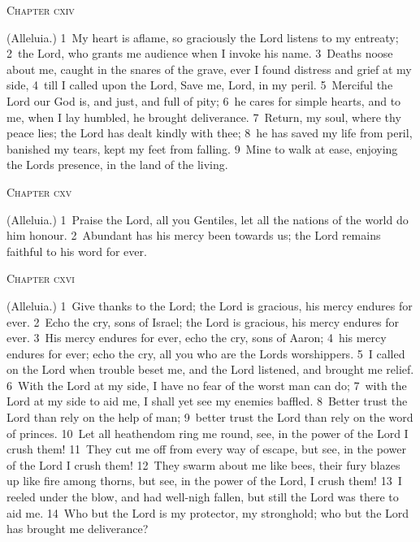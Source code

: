 \documentclass[10pt]{book} %
\begin{document}
\begin{large}\begin{center}\textsc{Chapter cxiv}\end{center}\end{large}
(Alleluia.)
\textcolor{benred8}{1}~My heart is aflame, so graciously the Lord listens to my entreaty; \textcolor{benred8}{2}~the Lord, who grants me audience when I invoke his name. \textcolor{benred8}{3}~Death\textquotesingle s noose about me, caught in the snares of the grave, ever I found distress and grief at my side, \textcolor{benred8}{4}~till I called upon the Lord, Save me, Lord, in my peril. \textcolor{benred8}{5}~Merciful the Lord our God is, and just, and full of pity; \textcolor{benred8}{6}~he cares for simple hearts, and to me, when I lay humbled, he brought deliverance. \textcolor{benred8}{7}~Return, my soul, where thy peace lies; the Lord has dealt kindly with thee; \textcolor{benred8}{8}~he has saved my life from peril, banished my tears, kept my feet from falling. \textcolor{benred8}{9}~Mine to walk at ease, enjoying the Lord\textquotesingle s presence, in the land of the living.
\begin{large}\begin{center}\textsc{Chapter cxv}\end{center}\end{large}
(Alleluia.)
\textcolor{benred8}{1}~Praise the Lord, all you Gentiles, let all the nations of the world do him honour. \textcolor{benred8}{2}~Abundant has his mercy been towards us; the Lord remains faithful to his word for ever.
\begin{large}\begin{center}\textsc{Chapter cxvi}\end{center}\end{large}
(Alleluia.)
\textcolor{benred8}{1}~Give thanks to the Lord; the Lord is gracious, his mercy endures for ever. \textcolor{benred8}{2}~Echo the cry, sons of Israel; the Lord is gracious, his mercy endures for ever. \textcolor{benred8}{3}~His mercy endures for ever, echo the cry, sons of Aaron; \textcolor{benred8}{4}~his mercy endures for ever; echo the cry, all you who are the Lord\textquotesingle s worshippers. \textcolor{benred8}{5}~I called on the Lord when trouble beset me, and the Lord listened, and brought me relief. \textcolor{benred8}{6}~With the Lord at my side, I have no fear of the worst man can do; \textcolor{benred8}{7}~with the Lord at my side to aid me, I shall yet see my enemies baffled. \textcolor{benred8}{8}~Better trust the Lord than rely on the help of man; \textcolor{benred8}{9}~better trust the Lord than rely on the word of princes. \textcolor{benred8}{10}~Let all heathendom ring me round, see, in the power of the Lord I crush them! \textcolor{benred8}{11}~They cut me off from every way of escape, but see, in the power of the Lord I crush them! \textcolor{benred8}{12}~They swarm about me like bees, their fury blazes up like fire among thorns, but see, in the power of the Lord, I crush them! \textcolor{benred8}{13}~I reeled under the blow, and had well-nigh fallen, but still the Lord was there to aid me. \textcolor{benred8}{14}~Who but the Lord is my protector, my stronghold; who but the Lord has brought me deliverance?
\end{document}

